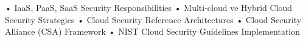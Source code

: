 • IaaS, PaaS, SaaS Security Responsibilities
• Multi-cloud ve Hybrid Cloud Security Strategies
• Cloud Security Reference Architectures
• Cloud Security Alliance (CSA) Framework
• NIST Cloud Security Guidelines Implementation